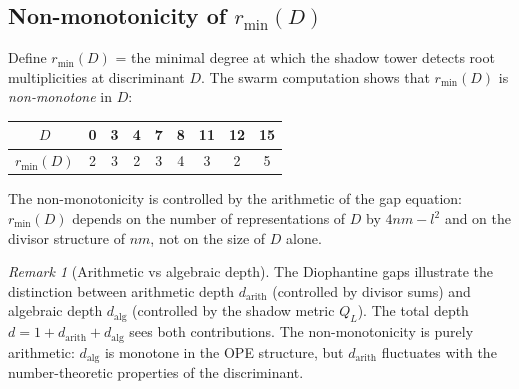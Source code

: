 \documentclass[11pt]{amsart}
\theoremstyle{definition}
\theoremstyle{remark}
\newtheorem{remark}[theorem]{Remark}
\begin{document}
\subsection{Non-monotonicity of $r_{\min}(D)$}

Define $r_{\min}(D)$ = the minimal degree at which the shadow
tower detects root multiplicities at discriminant $D$.
The swarm computation shows that $r_{\min}(D)$ is
\emph{non-monotone} in $D$:
\begin{center}
\renewcommand{\arraystretch}{1.2}
\begin{tabular}{c|cccccccc}
$D$ & 0 & 3 & 4 & 7 & 8 & 11 & 12 & 15 \\
\hline
$r_{\min}(D)$ & 2 & 3 & 2 & 3 & 4 & 3 & 2 & 5
\end{tabular}
\end{center}
\noindent
The non-monotonicity is controlled by the arithmetic of
the gap equation: $r_{\min}(D)$ depends on the number of
representations of $D$ by $4nm - l^2$ and on the divisor
structure of $nm$, not on the size of $D$ alone.

\begin{remark}[Arithmetic vs algebraic depth]
The Diophantine gaps illustrate the distinction between
arithmetic depth $d_{\mathrm{arith}}$ (controlled by
divisor sums) and algebraic depth $d_{\mathrm{alg}}$
(controlled by the shadow metric $Q_L$). The total
depth $d = 1 + d_{\mathrm{arith}} + d_{\mathrm{alg}}$
sees both contributions. The non-monotonicity is
purely arithmetic: $d_{\mathrm{alg}}$ is monotone in the
OPE structure, but $d_{\mathrm{arith}}$ fluctuates with
the number-theoretic properties of the discriminant.
\end{remark}
\end{document}
